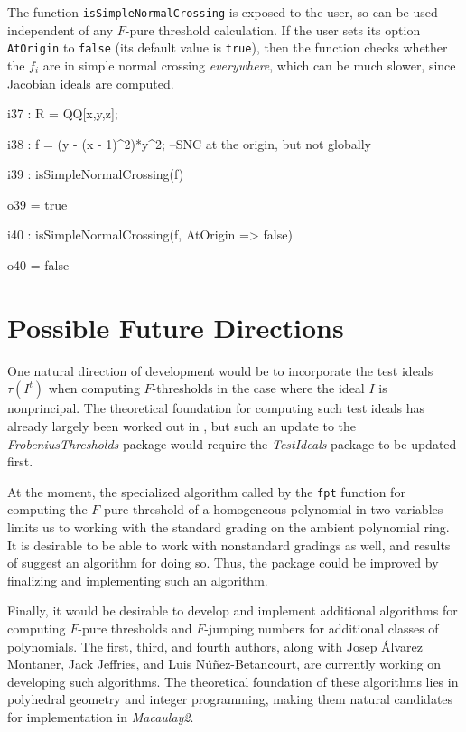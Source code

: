 \documentclass{amsart}
\begin{document}
The function \texttt{isSimpleNormalCrossing} is exposed to the user, so can be used independent of any $F$-pure threshold calculation.
If the user sets its option \texttt{AtOrigin} to \texttt{false} (its default value is \texttt{true}), then the function checks whether the $f_i$ are in simple normal crossing \emph{everywhere}, which can be much slower, since Jacobian ideals are computed.

\smallskip
{\small
{}
\begin{MyVerbatim}
i37 : R = QQ[x,y,z];

i38 : f = (y - (x - 1)^2)*y^2; --SNC at the origin, but not globally

i39 : isSimpleNormalCrossing(f)

o39 = true

i40 : isSimpleNormalCrossing(f, AtOrigin => false)

o40 = false
\end{MyVerbatim}
}
\smallskip

\section{Possible Future Directions}
\label{sec.FutureDirections}

One natural direction of development would be to  incorporate the test ideals $\tau(I^t)$ when computing $F$-thresholds in the case where the ideal $I$ is nonprincipal.
The theoretical foundation for computing such test ideals has already largely been worked out in \cite{SchwedeTuckerTestIdealsOfNonPrincipal}, but such an update to the \emph{FrobeniusThresholds} package would require the  \emph{TestIdeals} package to be updated first.

At the moment, the specialized algorithm called by the \texttt{fpt} function for computing the $F$-pure threshold of a homogeneous polynomial in two variables limits us to working with the standard grading on the ambient polynomial ring.  It is desirable to be able to work with nonstandard gradings as well, and results of \cite{HernandezTeixeiraFThresholdFunctions} suggest an algorithm for doing so.  Thus, the package could be improved by finalizing and implementing such an algorithm.

Finally, it would be desirable to develop and implement additional algorithms for computing $F$-pure thresholds and $F$-jumping numbers for additional classes of polynomials.  The first, third, and fourth authors, along with Josep \'Alvarez Montaner, Jack Jeffries, and Luis N\'u\~nez-Betancourt,  are currently working on developing such algorithms.  The theoretical foundation of these algorithms lies in polyhedral geometry and integer programming, making them natural candidates for  implementation in \emph{Macaulay2}.  




\end{document}
